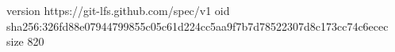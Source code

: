 version https://git-lfs.github.com/spec/v1
oid sha256:326fd88e07944799855c05c61d224cc5aa9f7b7d78522307d8c173cc74c6ecec
size 820
